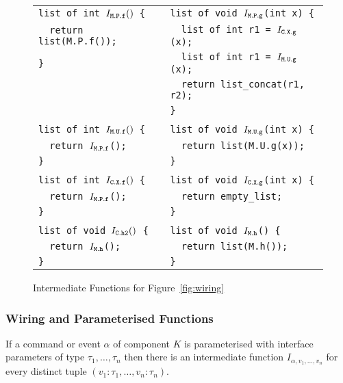\documentclass[11pt]{article}
\newcommand{\code}[1]{{\tt #1}}
\begin{document}
\begin{figure}
\begin{tabular}{ll}
\tt list of int $I_\code{M.P.f}()$ \{ & \tt list of void $I_\code{M.P.g}$(int x) \{ \\
\tt \ \ return list(M.P.f());         & \tt \ \ list of int r1 = $I_\code{C.X.g}$(x); \\
\tt \}                                & \tt \ \ list of int r1 = $I_\code{M.U.g}$(x); \\
                                      & \tt \ \ return list\_concat(r1, r2); \\
                                      & \tt \} \\
\\
\tt list of int $I_\code{M.U.f}()$ \{ & \tt list of void $I_\code{M.U.g}$(int x) \{ \\
\tt \ \ return $I_\code{M.P.f}$();    & \tt \ \ return list(M.U.g(x)); \\
\tt \}                                & \tt \} \\
\\
\tt list of int $I_\code{C.X.f}()$ \{ & \tt list of void $I_\code{C.X.g}$(int x) \{ \\
\tt \ \ return $I_\code{M.P.f}$();    & \tt \ \ return empty\_list; \\
\tt \}                                & \tt \} \\
\\
\tt list of void $I_\code{C.h2}()$ \{ & \tt list of void $I_\code{M.h}$() \{ \\
\tt \ \ return $I_\code{M.h}$();      & \tt \ \ return list(M.h()); \\
\tt \}                                & \tt \} \\
\end{tabular}
\caption{Intermediate Functions for Figure~\ref{fig:wiring}}
\label{fig:wiring-fns}
\end{figure}

\subsubsection{Wiring and Parameterised Functions}
\label{sec:wiring-parms}

If a command or event $\alpha$ of component $K$ is parameterised with
interface parameters of type $\tau_1, \ldots, \tau_n$ then there is an
intermediate function $I_{\alpha,v_1,\ldots,v_n}$ for every distinct tuple
$(v_1:\tau_1, \ldots, v_n:\tau_n)$.
\end{document}
